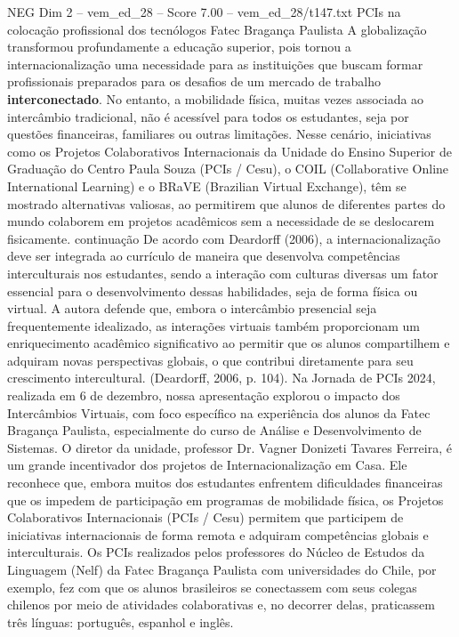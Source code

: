 \begin{textsample}{NEG Dim 2 – vem\_ed\_28 – Score 7.00 – vem\_ed\_28/t147.txt}  \label{ex:f2_neg_117}
PCIs na colocação profissional dos tecnólogos Fatec Bragança Paulista A globalização transformou profundamente a educação superior, pois tornou a internacionalização uma necessidade para as instituições que buscam formar profissionais preparados para os desafios de um mercado de trabalho \textbf{interconectado}.
No entanto, a mobilidade física, muitas vezes associada ao intercâmbio tradicional, não é acessível para todos os estudantes, seja por questões financeiras, familiares ou outras limitações.
Nesse cenário, iniciativas como os Projetos Colaborativos Internacionais da Unidade do Ensino Superior de Graduação do Centro Paula Souza (PCIs / Cesu), o COIL (Collaborative Online International Learning) e o BRaVE (Brazilian Virtual Exchange), têm se mostrado alternativas valiosas, ao permitirem que alunos de diferentes partes do mundo colaborem em projetos acadêmicos sem a necessidade de se deslocarem fisicamente. continuação De acordo com Deardorff (2006), a internacionalização deve ser integrada ao currículo de maneira que desenvolva competências interculturais nos estudantes, sendo a interação com culturas diversas um fator essencial para o desenvolvimento dessas habilidades, seja de forma física ou virtual.
A autora defende que, embora o intercâmbio presencial seja frequentemente idealizado, as interações virtuais também proporcionam um enriquecimento acadêmico significativo ao permitir que os alunos compartilhem e adquiram novas perspectivas globais, o que contribui diretamente para seu crescimento intercultural. (Deardorff, 2006, p. 104).
Na Jornada de PCIs 2024, realizada em 6 de dezembro, nossa apresentação explorou o impacto dos Intercâmbios Virtuais, com foco específico na experiência dos alunos da Fatec Bragança Paulista, especialmente do curso de Análise e Desenvolvimento de Sistemas.
O diretor da unidade, professor Dr.
Vagner Donizeti Tavares Ferreira, é um grande incentivador dos projetos de Internacionalização em Casa.
Ele reconhece que, embora muitos dos estudantes enfrentem dificuldades financeiras que os impedem de participação em programas de mobilidade física, os Projetos Colaborativos Internacionais (PCIs / Cesu) permitem que participem de iniciativas internacionais de forma remota e adquiram competências globais e interculturais.
Os PCIs realizados pelos professores do Núcleo de Estudos da Linguagem (Nelf) da Fatec Bragança Paulista com universidades do Chile, por exemplo, fez com que os alunos brasileiros se conectassem com seus colegas chilenos por meio de atividades colaborativas e, no decorrer delas, praticassem três línguas: português, espanhol e inglês.

\end{textsample}
